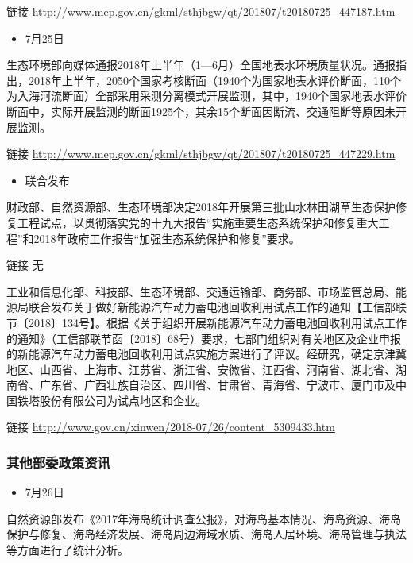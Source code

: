 \documentclass[]{book}
\providecommand{\tightlist}{%
  \setlength{\itemsep}{0pt}\setlength{\parskip}{0pt}}
\begin{document}
链接
\url{http://www.mep.gov.cn/gkml/sthjbgw/qt/201807/t20180725_447187.htm}

\begin{itemize}
\tightlist
\item
  7月25日
\end{itemize}

生态环境部向媒体通报2018年上半年（1---6月）全国地表水环境质量状况。通报指出，2018年上半年，2050个国家考核断面（1940个为国家地表水评价断面，110个为入海河流断面）全部采用采测分离模式开展监测，其中，1940个国家地表水评价断面中，实际开展监测的断面1925个，其余15个断面因断流、交通阻断等原因未开展监测。

链接
\url{http://www.mep.gov.cn/gkml/sthjbgw/qt/201807/t20180725_447229.htm}

\begin{itemize}
\tightlist
\item
  联合发布
\end{itemize}

财政部、自然资源部、生态环境部决定2018年开展第三批山水林田湖草生态保护修复工程试点，以贯彻落实党的十九大报告``实施重要生态系统保护和修复重大工程''和2018年政府工作报告``加强生态系统保护和修复''要求。

链接 无

工业和信息化部、科技部、生态环境部、交通运输部、商务部、市场监管总局、能源局联合发布关于做好新能源汽车动力蓄电池回收利用试点工作的通知【工信部联节〔2018〕134号】。根据《关于组织开展新能源汽车动力蓄电池回收利用试点工作的通知》（工信部联节函〔2018〕68号）要求，七部门组织对有关地区及企业申报的新能源汽车动力蓄电池回收利用试点实施方案进行了评议。经研究，确定京津冀地区、山西省、上海市、江苏省、浙江省、安徽省、江西省、河南省、湖北省、湖南省、广东省、广西壮族自治区、四川省、甘肃省、青海省、宁波市、厦门市及中国铁塔股份有限公司为试点地区和企业。

链接 \url{http://www.gov.cn/xinwen/2018-07/26/content_5309433.htm}

\subsubsection*{其他部委政策资讯}\label{-3}

\begin{itemize}
\tightlist
\item
  7月26日
\end{itemize}

自然资源部发布《2017年海岛统计调查公报》，对海岛基本情况、海岛资源、海岛保护与修复、海岛经济发展、海岛周边海域水质、海岛人居环境、海岛管理与执法等方面进行了统计分析。
\end{document}
